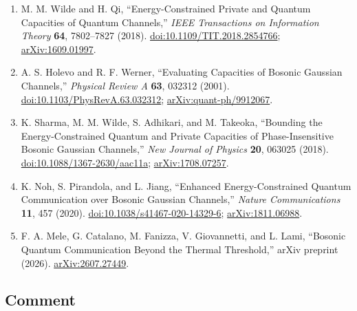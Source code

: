 \begin{enumerate}[label={},leftmargin=4.8em,labelsep=0.5em]
  \footnotesize
  \item[\textup{[WQ18]}]\label{ref:p51-wilde-qi}
  M. M. Wilde and H. Qi,
  ``Energy-Constrained Private and Quantum Capacities of Quantum Channels,''
  \emph{IEEE Transactions on Information Theory} \textbf{64}, 7802--7827
  (2018).
  \href{https://doi.org/10.1109/TIT.2018.2854766}{doi:10.1109/TIT.2018.2854766};
  \href{https://arxiv.org/abs/1609.01997}{arXiv:1609.01997}.

  \item[\textup{[HW01]}]\label{ref:p51-holevo-werner}
  A. S. Holevo and R. F. Werner,
  ``Evaluating Capacities of Bosonic Gaussian Channels,''
  \emph{Physical Review A} \textbf{63}, 032312 (2001).
  \href{https://doi.org/10.1103/PhysRevA.63.032312}{doi:10.1103/PhysRevA.63.032312};
  \href{https://arxiv.org/abs/quant-ph/9912067}{arXiv:quant-ph/9912067}.

  \item[\textup{[SWA+18]}]\label{ref:p51-sharma-et-al}
  K. Sharma, M. M. Wilde, S. Adhikari, and M. Takeoka,
  ``Bounding the Energy-Constrained Quantum and Private Capacities of
  Phase-Insensitive Bosonic Gaussian Channels,''
  \emph{New Journal of Physics} \textbf{20}, 063025 (2018).
  \href{https://doi.org/10.1088/1367-2630/aac11a}{doi:10.1088/1367-2630/aac11a};
  \href{https://arxiv.org/abs/1708.07257}{arXiv:1708.07257}.

  \item[\textup{[NPJ20]}]\label{ref:p51-noh-pirandola-jiang}
  K. Noh, S. Pirandola, and L. Jiang,
  ``Enhanced Energy-Constrained Quantum Communication over Bosonic Gaussian
  Channels,'' \emph{Nature Communications} \textbf{11}, 457 (2020).
  \href{https://doi.org/10.1038/s41467-020-14329-6}{doi:10.1038/s41467-020-14329-6};
  \href{https://arxiv.org/abs/1811.06988}{arXiv:1811.06988}.

  \item[\textup{[MCF+26]}]\label{ref:p51-mele-et-al}
  F. A. Mele, G. Catalano, M. Fanizza, V. Giovannetti, and L. Lami,
  ``Bosonic Quantum Communication Beyond the Thermal Threshold,''
  arXiv preprint (2026).
  \href{https://arxiv.org/abs/2607.27449}{arXiv:2607.27449}.
\end{enumerate}

\subsection*{Comment}

